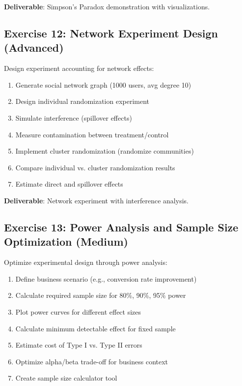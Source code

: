 \textbf{Deliverable}: Simpson's Paradox demonstration with visualizations.

\subsection{Exercise 12: Network Experiment Design (Advanced)}

Design experiment accounting for network effects:

\begin{enumerate}
    \item Generate social network graph (1000 users, avg degree 10)
    \item Design individual randomization experiment
    \item Simulate interference (spillover effects)
    \item Measure contamination between treatment/control
    \item Implement cluster randomization (randomize communities)
    \item Compare individual vs. cluster randomization results
    \item Estimate direct and spillover effects
\end{enumerate}

\textbf{Deliverable}: Network experiment with interference analysis.

\subsection{Exercise 13: Power Analysis and Sample Size Optimization (Medium)}

Optimize experimental design through power analysis:

\begin{enumerate}
    \item Define business scenario (e.g., conversion rate improvement)
    \item Calculate required sample size for 80\%, 90\%, 95\% power
    \item Plot power curves for different effect sizes
    \item Calculate minimum detectable effect for fixed sample
    \item Estimate cost of Type I vs. Type II errors
    \item Optimize alpha/beta trade-off for business context
    \item Create sample size calculator tool
\end{enumerate}

